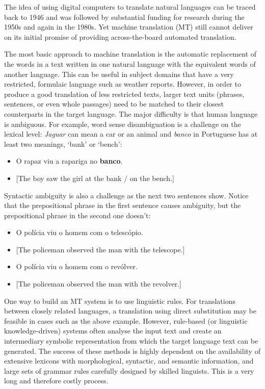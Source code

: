 \begin{multicols}{2}
The idea of using digital computers to translate natural languages can be traced back to 1946 and was followed by substantial funding for research during the 1950s and again in the 1980s. 
Yet machine translation (MT) still cannot deliver on its initial promise of providing across-the-board automated translation.  


The most basic approach to machine translation is the automatic replacement of the words in a text written in one natural language with the equivalent words of another language. This can be useful in subject domains that have a very restricted, formulaic language such as weather reports.
However, in order to produce a good translation of less restricted texts, larger text units (phrases, sentences, or even whole passages) need to be matched to their closest counterparts in the target language. The major difficulty is that human language is ambiguous. For example, word sense disambiguation is a challenge on the lexical level: \textit{Jaguar} can mean a car or an animal and \textit{banco} in Portuguese has at least two meanings, ‘bank’ or ‘bench’:\\

\begin{itemize}
\item O rapaz viu a rapariga no \textbf{banco}.
\item  {[}The boy saw the girl at the bank / on the bench.{]}
\end{itemize}

Syntactic ambiguity is also a challenge as the next two sentences show. Notice that the prepositional phrase in the first sentence causes ambiguity, but the prepositional phrase in the second one doesn't:\\

\begin{itemize}
\item O polícia viu o homem com o telescópio.
\item {[}The policeman observed the man with the telescope.{]}
\item O polícia viu o homem com o revólver.
\item {[}The policeman observed the man with the revolver.{]}
\end{itemize}

One way to build an MT system is to use linguistic rules. For translations between closely related languages, a translation using direct substitution may be feasible in cases such as the above example. However, rule-based (or linguistic knowledge-driven) systems often analyse the input text and create an intermediary symbolic representation from which the target language text can be generated. The success of these methods is highly dependent on the availability of extensive lexicons with morphological, syntactic, and semantic information, and large sets of grammar rules carefully designed by skilled linguists. This is a very long and therefore costly process.


\end{multicols}
